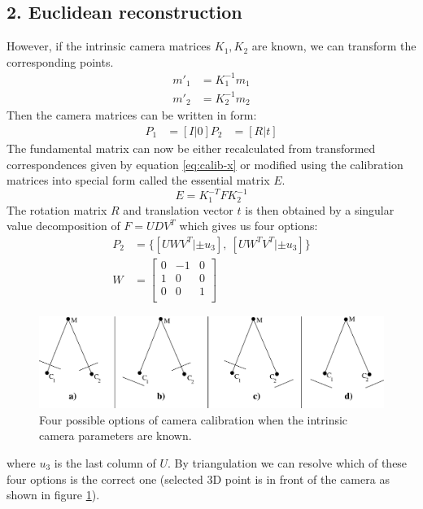 \subsection*{2. Euclidean reconstruction}
However, if the intrinsic camera matrices $K_1, K_2$ are known, we can transform the corresponding points.
\begin{equation}
  \begin{aligned}
	m'_1 &= K_1^{-1} m_1 \\
	m'_2 &= K_2^{-1} m_2
  \end{aligned}
	\label{eq:calib-x}
\end{equation}
Then the camera matrices can be written in form:
\begin{equation}
  \begin{aligned}
	P_1 &= [I|0]
	P_2 &= [R|t] 
  \end{aligned}
\end{equation}
The fundamental matrix can now be either recalculated from transformed correspondences given by equation \ref{eq:calib-x} or modified using the calibration matrices into special form called the essential matrix $E$.
\begin{equation}
	E = K_1^{-T} F K_2^{-1}
\end{equation}
The rotation matrix $R$ and translation vector $t$ is then obtained by a singular value decomposition of $F = UDV^T$ which gives us four options:
\begin{equation}
  \begin{aligned}
	P_2 &= \{[UWV^T | \pm u_3],~[UW^T V^T | \pm u_3]\} \\
	W &= 
	\begin{bmatrix}
		0 & -1 & 0 \\	
		1 & 0 & 0 \\	
		0 & 0 & 1 \\	
	\end{bmatrix}
  \end{aligned}
\end{equation}
\begin{figure}[!htbp]
	\begin{center}
		\includegraphics[keepaspectratio,width=\textwidth]{fig/calibration-options.pdf}
	\end{center}
	\caption{Four possible options of camera calibration when the intrinsic camera parameters are known.}
	\label{fig:caliboptions}
\end{figure}
where $u_3$ is the last column of $U$. By triangulation we can resolve which of these four options is the correct one (selected 3D point is in front of the camera as shown in figure \ref{fig:caliboptions}). \cite{cvfx, elements-of-computer-vision, book:multiple_view_geometry}

